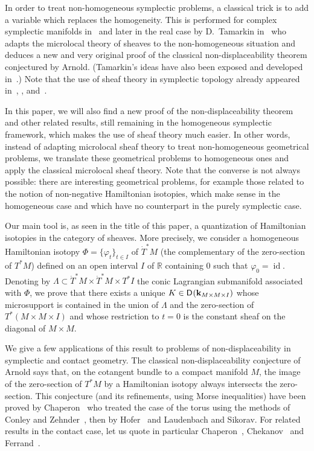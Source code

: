 \documentclass[12pt,leqno]{article}
\theoremstyle{definition}
\newcommand{\R}{{\mathbb{R}}}
\def\phi{{\varphi}}
\newcommand{\cor}{{\bf k}}
\DeclareMathOperator{\id}{id}
\newcommand{\Der}[1][]{\mathsf{D}^{#1}}
\newcommand{\dT}{{\dot{T}}}
\newcommand{\dTM}{{\dT}^*M}
\numberwithin{equation}{section}
\begin{document}
In order to treat non-homogeneous symplectic problems, a classical trick 
is to add a variable which replaces the homogeneity. This is performed for
complex symplectic manifolds in~\cite{PS04} and later in the real case 
by D.~Tamarkin in~\cite{Ta} 
who adapts the microlocal theory of sheaves to the non-homogeneous situation 
and deduces a new and very original
proof of the classical non-displaceability theorem conjectured by
Arnold. 
(Tamarkin's ideas have also been exposed and developed in~\cite{GS11}.)
Note that the use of sheaf theory in symplectic topology
already appeared in~\cite{KO01}, \cite{N06}, \cite{NZ09} and~\cite{O98}.


In this paper, we will also find a new proof of the non-displaceability 
theorem and other related
results, still remaining in the homogeneous symplectic framework, 
which makes the use of sheaf theory much easier. 
In other words, instead of adapting
microlocal sheaf theory to treat non-homogeneous geometrical problems, 
we translate these geometrical problems to homogeneous ones and apply 
the classical microlocal sheaf theory. 
Note that the converse is not always possible: there are 
interesting geometrical problems, for example those related to the notion of 
non-negative Hamiltonian isotopies,
which make sense in the homogeneous case
and which have no counterpart in the purely symplectic case.


Our main tool is, as seen in the
title of this paper, a quantization of Hamiltonian isotopies in the category
of sheaves. More precisely, we consider a homogeneous 
Hamiltonian isotopy
$\Phi=\{\phi_t\}_{t\in I}$ of $\dTM$ (the complementary of the
zero-section of $T^*M$) defined on an open interval $I$ of
$\R$ containing $0$ such that $\phi_0=\id$. 
Denoting by $\Lambda\subset \dTM\times \dTM\times T^*I$ the conic Lagrangian
submanifold associated with $\Phi$, we prove that there exists a unique 
$K\in\Der(\cor_{M\times M\times I})$ whose
microsupport is contained in the union of $\Lambda$ and the zero-section of
$T^*(M\times M\times I)$ and
whose restriction to $t=0$ is the constant sheaf on the diagonal of  $M\times M$.

We give a few applications of this result to problems of  non-displaceability
in symplectic and contact geometry.
The classical non-displaceability conjecture of Arnold 
says that, on the
cotangent bundle to a compact manifold $M$, the image of the
zero-section of $T^*M$ by a Hamiltonian isotopy always intersects 
the zero-section. 
This conjecture (and its refinements, using Morse inequalities)
have been proved by Chaperon~\cite{Cha83} who treated the case of the torus using the
methods of Conley and Zehnder~\cite{CZ83}, 
then by Hofer~\cite{Ho85} and  Laudenbach and Sikorav\cite{LS85}.
For related results in the contact case, let us quote in particular 
Chaperon~\cite{Cha95}, Chekanov~\cite{Ck96} and  Ferrand~\cite{Fe97}.
\end{document}
